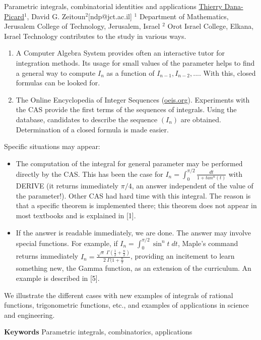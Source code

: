 \begin{abstract_online}{Parametric integrals, combinatorial identities and applications}{%
        \underline{Thierry Dana-Picard}$^{1}$, David G. Zeitoun$^{2}$}{[ndp@jct.ac.il]
        }{%
        $^1$ Department of Mathematics, Jerusalem College of Technology, Jerusalem, Israel \newline{}$^2$ Orot Israel College, Elkana, Israel \newline{}}
Technology contributes to the study in various ways.
\begin{enumerate}
\item A Computer Algebra System provides often an interactive tutor for integration methods. Its usage for small values of the parameter helps to find a general way to compute $I_n$ as a function of $I_{n-1}, I_{n-2},...$. With this, closed formulas can be looked for.
\item The Online Encyclopedia of Integer Sequences (\url{oeis.org}). Experiments with the CAS provide the first terms of the sequences of integrals. Using the database, candidates to describe the sequence $(I_n)$ are obtained. Determination of a closed formula is made easier.
\end{enumerate}

Specific situations may appear:
 \begin{itemize}
 \item The computation of the integral for general parameter may be performed directly by the CAS. This has been the case for $I_n=\int_0^{\pi /2 } \frac {dt}{1+tan^n(t)}$ with DERIVE (it returns immediately $\pi / 4$, an answer independent of the value of the parameter!). Other CAS had hard time with this integral. The reason is that a specific theorem is implemented there; this theorem does not appear in most textbooks and is explained in [1].
 \item If the answer is readable immediately, we are done. The answer may involve special functions. For example, if $I_n=\int_0^{\pi / 2} \sin^n t \; dt$, Maple's command returns immediately $I_n=\frac{\sqrt{\pi} \; \Gamma (\frac 12 + \frac n2)}{2 \; \Gamma (1+ \frac n2}$, providing an incitement to learn something new, the Gamma function, as an extension of the curriculum. An example is described in [5].
 \end{itemize}

We illustrate the different cases with new examples of integrals of rational functions, trigonometric functions, etc., and examples of applications in science and engineering.




\textbf{Keywords} \newline{} Parametric integrals, combinatorics, applications


\end{abstract_online}
